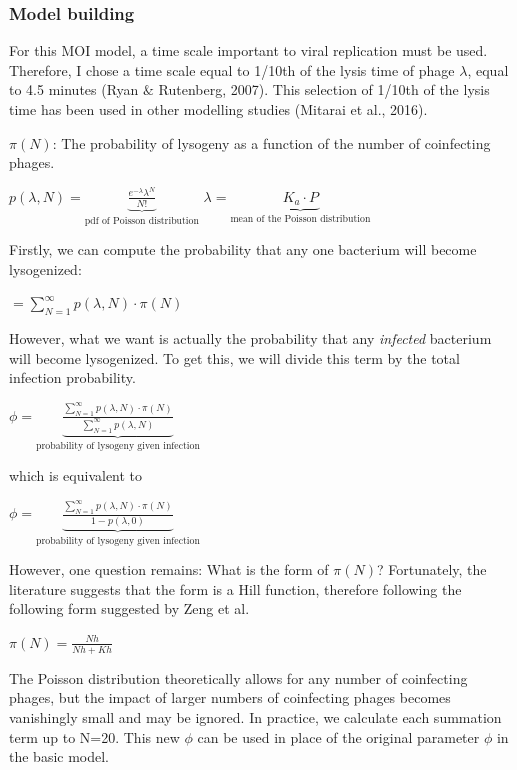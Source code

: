 \documentclass{article}
\begin{document}
\subsubsection{Model building}
For this MOI model, a time scale important to viral replication must be used. Therefore, I chose a time scale equal to 1/10th of the lysis time of phage $\lambda$, equal to 4.5 minutes (Ryan $\&$ Rutenberg, 2007). This selection of 1/10th of the lysis time has been used in other modelling studies (Mitarai et al., 2016). 

$\pi(N)$: The probability of lysogeny as a function of the number of coinfecting phages. 

\begin{center}$
p(\lambda, N) = \underbrace{\frac{{e^{ - \lambda } \lambda ^N}}{{N!}}}_{\text{pdf of Poisson distribution}}$
$\lambda = \underbrace{K_a \cdot P}_{\text{mean of the Poisson distribution}}$
\end{center} 

Firstly, we can compute the probability that any one bacterium will become lysogenized:
\begin{center}
$=\sum_{N=1}^{\infty}{p(\lambda, N) \cdot \pi(N)}$
\end{center}

However, what we want is actually the probability that any \emph{infected} bacterium will become lysogenized. To get this, we will divide this term by the total infection probability. 
\begin{center}
$
\phi = \underbrace{\frac{\sum_{N=1}^{\infty}{p(\lambda, N) \cdot \pi(N)}}{\sum_{N=1}^{\infty}p(\lambda, N) }}_{\text{probability of lysogeny given infection}}$
\end{center}

which is equivalent to 
\begin{center}
$\phi = \underbrace{\frac{\sum_{N=1}^{\infty}{p(\lambda, N) \cdot \pi(N)}}{1-p(\lambda, 0)}}_{\text{probability of lysogeny given infection}}$
\end{center}

However, one question remains: What is the form of $\pi(N)$? Fortunately, the literature suggests that the form is a Hill function, therefore following the following form suggested by Zeng et al.

\begin{center}
$\pi(N) = \frac{Nh}{Nh + Kh}$
\end{center}

 

The Poisson distribution theoretically allows for any number of coinfecting phages, but the impact of larger numbers of coinfecting phages becomes vanishingly small and may be ignored. In practice, we calculate each summation term up to N=20. This new $\phi$ can be used in place of the original parameter $\phi$ in the basic model.
\end{document}
